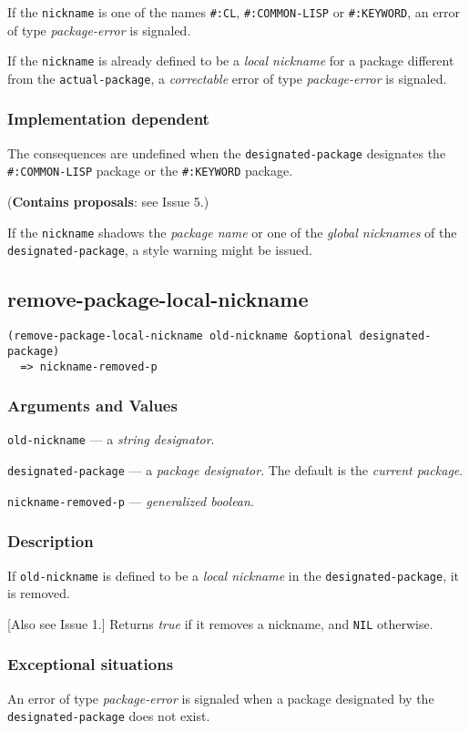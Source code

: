 \documentclass[11pt]{article}
\begin{document}
If the \texttt{nickname} is one of the names \texttt{\#:CL}, \texttt{\#:COMMON-LISP} or \texttt{\#:KEYWORD}, an
error of type \emph{package-error} is signaled.

If the \texttt{nickname} is already defined to be a \emph{local nickname} for a package
different from the \texttt{actual-package}, a \emph{correctable} error of type \emph{package-error}
is signaled.
\subsubsection{Implementation dependent}
\label{sec:org39f6a11}
The consequences are undefined when the \texttt{designated-package} designates the
\texttt{\#:COMMON-LISP} package or the \texttt{\#:KEYWORD} package.

(\textbf{Contains proposals}: see Issue 5.)

If the \texttt{nickname} shadows the \emph{package name} or one of the \emph{global nicknames} of
the \texttt{designated-package}, a style warning might be issued.
\subsection{remove-package-local-nickname}
\label{sec:org4afd585}
\begin{verbatim}
(remove-package-local-nickname old-nickname &optional designated-package)
  => nickname-removed-p
\end{verbatim}
\subsubsection{Arguments and Values}
\label{sec:orga81c135}
\texttt{old-nickname} --- a \emph{string designator}.

\texttt{designated-package} --- a \emph{package designator}.
The default is the \emph{current package}.

\texttt{nickname-removed-p} --- \emph{generalized boolean}.
\subsubsection{Description}
\label{sec:orgefda88a}
If \texttt{old-nickname} is defined to be a \emph{local nickname} in the \texttt{designated-package},
it is removed.

[Also see Issue 1.] Returns \emph{true} if it removes a nickname, and \texttt{NIL} otherwise.
\subsubsection{Exceptional situations}
\label{sec:orgcb4f7cc}
An error of type \emph{package-error} is signaled when a package designated by the
\texttt{designated-package} does not exist.
\end{document}
